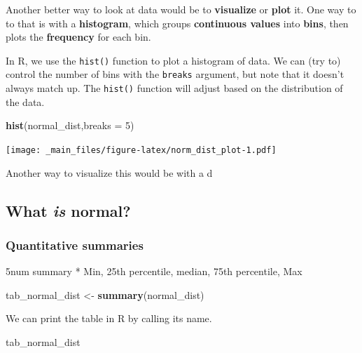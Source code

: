 \documentclass[
]{book}
\newenvironment{Shaded}{\begin{snugshade}}{\end{snugshade}}
\newcommand{\AttributeTok}[1]{\textcolor[rgb]{0.13,0.29,0.53}{#1}}
\newcommand{\DecValTok}[1]{\textcolor[rgb]{0.00,0.00,0.81}{#1}}
\newcommand{\FunctionTok}[1]{\textcolor[rgb]{0.13,0.29,0.53}{\textbf{#1}}}
\newcommand{\NormalTok}[1]{#1}
\newcommand{\OtherTok}[1]{\textcolor[rgb]{0.56,0.35,0.01}{#1}}
\begin{document}
Another better way to look at data would be to \textbf{visualize} or \textbf{plot} it. One way to to that is with a \textbf{histogram}, which groups \textbf{continuous values} into \textbf{bins}, then plots the \textbf{frequency} for each bin.

In R, we use the \texttt{hist()} function to plot a histogram of data. We can (try to) control the number of bins with the \texttt{breaks} argument, but note that it doesn't always match up. The \texttt{hist()} function will adjust based on the distribution of the data.

\begin{Shaded}
\begin{Highlighting}[]
\FunctionTok{hist}\NormalTok{(normal\_dist,}\AttributeTok{breaks =} \DecValTok{5}\NormalTok{)}
\end{Highlighting}
\end{Shaded}

\texttt{[image: \_main\_files/figure-latex/norm\_dist\_plot-1.pdf]}

Another way to visualize this would be with a d

\hypertarget{what-is-normal}{%
\subsection{\texorpdfstring{What \emph{is} normal?}{What is normal?}}\label{what-is-normal}}

\hypertarget{quantitative-summaries}{%
\subsubsection{Quantitative summaries}\label{quantitative-summaries}}

5num summary
* Min, 25th percentile, median, 75th percentile, Max

\begin{Shaded}
\begin{Highlighting}[]
\NormalTok{tab\_normal\_dist }\OtherTok{\textless{}{-}} \FunctionTok{summary}\NormalTok{(normal\_dist)}
\end{Highlighting}
\end{Shaded}

We can print the table in R by calling its name.

\begin{Shaded}
\begin{Highlighting}[]
\NormalTok{tab\_normal\_dist}
\end{Highlighting}
\end{Shaded}
\end{document}
